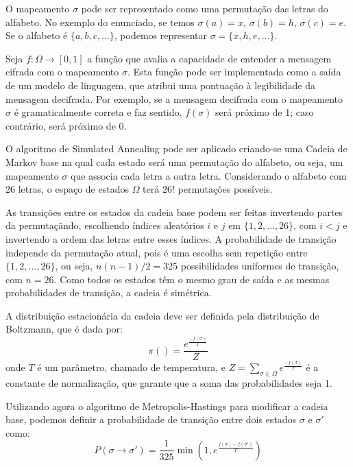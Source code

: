 \begin{resposta}
    O mapeamento $\sigma$ pode ser representado como uma permutação das letras do alfabeto. No exemplo do enunciado, se temos $\sigma(a) = x$, $\sigma(b) = h$, $\sigma(c) = e$. Se o alfabeto é $\{a, b, c, \ldots\}$, podemos representar $\sigma=\{x, h, e, \ldots\}$.

    Seja $f : \Omega \rightarrow [0,1]$ a função que avalia a capacidade de entender a mensagem cifrada com o mapeamento $\sigma$. Esta função pode ser implementada como a saída de um modelo de linguagem, que atribui uma pontuação à legibilidade da mensagem decifrada. Por exemplo, se a mensagem decifrada com o mapeamento $\sigma$ é gramaticalmente correta e faz sentido, $f(\sigma)$ será próximo de 1; caso contrário, será próximo de 0.

    O algoritmo de Simulated Annealing pode ser aplicado criando-se uma Cadeia de Markov base na qual cada estado será uma permutação do alfabeto, ou seja, um mapeamento $\sigma$ que associa cada letra a outra letra. Considerando o alfabeto com 26 letras, o espaço de estados $\Omega$ terá $26!$ permutações possíveis.

    As transições entre os estados da cadeia base podem ser feitas invertendo partes da permutaçãndo, escolhendo índices aleatórios $i$ e $j$ em $\{1, 2, \ldots, 26\}$, com $i<j$ e invertendo a ordem das letras entre esses índices. A probabilidade de transição independe da permutação atual, pois é uma escolha sem repetição entre $\{1, 2, \ldots, 26\}$, ou seja, $n(n-1)/2=325$ possibilidades uniformes de transição, com $n=26$. Como todos os estados têm o mesmo grau de saída e as mesmas probabilidades de transição, a cadeia é simétrica.

    A distribuição estacionária da cadeia deve ser definida pela distribuição de Boltzmann, que é dada por:
    $$ \pi() = \frac{e^{\frac{-f(\sigma)}{T}}}{Z} $$
    onde $T$ é um parâmetro, chamado de temperatura, e $Z=\sum_{\sigma \in \Omega} e^{\frac{-f(\sigma)}{T}}$ é a constante de normalização, que garante que a soma das probabilidades seja 1.

    Utilizando agora o algoritmo de Metropolis-Hastings para modificar a cadeia base, podemos definir a probabilidade de transição entre dois estados $\sigma$ e $\sigma'$ como:
    $$ P(\sigma \rightarrow \sigma') = \frac{1}{325}\min\left(1, e^{\frac{f(\sigma)-f(\sigma')}{T}}\right) $$
\end{resposta}
